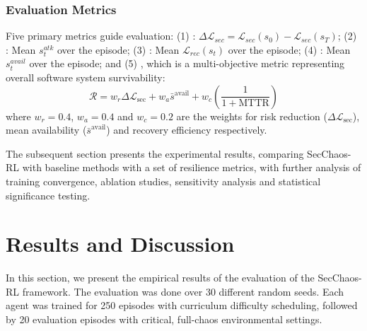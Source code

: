 \documentclass[pdflatex,sn-mathphys-num]{sn-jnl}%
\theoremstyle{thmstyleone}%
\theoremstyle{thmstyletwo}%
\theoremstyle{thmstylethree}%
\begin{document}
	\subsubsection{Evaluation Metrics}
	
	Five primary metrics guide evaluation: (1) : $\Delta\mathcal{L}_{sec} = \mathcal{L}_{sec}(s_0) - \mathcal{L}_{sec}(s_T)$; (2) : Mean $s_t^{atk}$ over the episode; (3) : Mean $\mathcal{L}_{rec}(s_t)$ over the episode; (4) : Mean $s_t^{avail}$ over the episode; and (5) , which is a multi-objective metric representing overall software system survivability:
	\begin{equation}
		\mathcal{R} = w_r \Delta\mathcal{L}_{\text{sec}} + w_a \bar{s}^{\text{avail}} + w_c \left(\frac{1}{1 + \text{MTTR}}\right)
	\end{equation}
	where $w_r=0.4$, $w_a=0.4$ and $w_c=0.2$ are the weights for risk reduction ($\Delta\mathcal{L}_{\text{sec}}$), mean availability ($\bar{s}^{\text{avail}}$) and recovery efficiency respectively. 
	
	The subsequent section presents the experimental results, comparing SecChaos-RL with baseline methods with a set of resilience metrics, with further analysis of training convergence, ablation studies, sensitivity analysis and statistical significance testing. 
	
	\section{Results and Discussion}
	
	In this section, we present the empirical results of the evaluation of the SecChaos-RL framework. The evaluation was done over 30 different random seeds. Each agent was trained for 250 episodes with curriculum difficulty scheduling, followed by 20 evaluation episodes with critical, full-chaos environmental settings.
	
\end{document}
